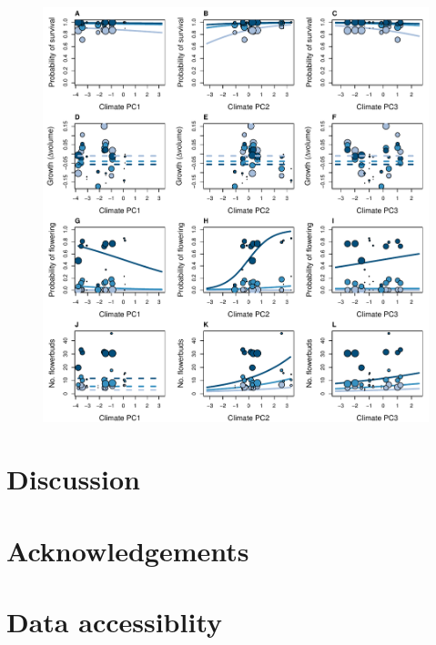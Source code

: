 \documentclass[12pt]{article}\usepackage[]{graphicx}\usepackage[]{color}
\begin{document}
\newpage
\begin{figure}[h!]
  \caption{}
  \label{Fig1}
  \begin{center}
    \includegraphics[width=\linewidth]{Figures/vital_rates.pdf}
  \end{center}
\end{figure}


\section*{Discussion}

\section*{Acknowledgements}

\section*{Data accessiblity}


\end{document}

